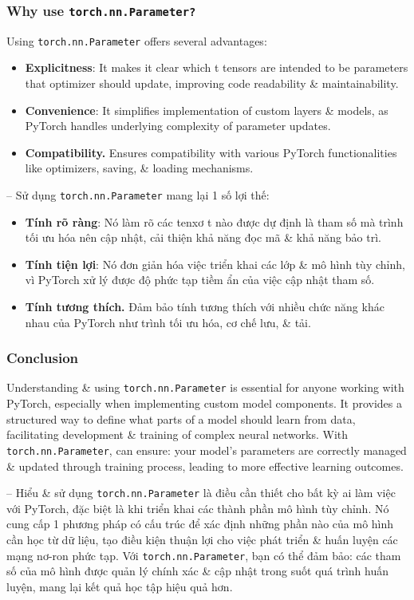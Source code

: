 \documentclass{article}
\begin{document}
\subsubsection{Why use {\tt torch.nn.Parameter?}}
Using {\tt torch.nn.Parameter} offers several advantages:
\begin{itemize}
    \item {\bf Explicitness}: It makes it clear which t tensors are intended to be parameters that optimizer should update, improving code readability \& maintainability.
    \item {\bf Convenience}: It simplifies implementation of custom layers \& models, as PyTorch handles underlying complexity of parameter updates.
    \item {\bf Compatibility.} Ensures compatibility with various PyTorch functionalities like optimizers, saving, \& loading mechanisms.
\end{itemize}
-- Sử dụng {\tt torch.nn.Parameter} mang lại 1 số lợi thế:
\begin{itemize}
    \item {\bf Tính rõ ràng}: Nó làm rõ các tenxơ t nào được dự định là tham số mà trình tối ưu hóa nên cập nhật, cải thiện khả năng đọc mã \& khả năng bảo trì.
    \item {\bf Tính tiện lợi}: Nó đơn giản hóa việc triển khai các lớp \& mô hình tùy chỉnh, vì PyTorch xử lý được độ phức tạp tiềm ẩn của việc cập nhật tham số.
    \item {\bf Tính tương thích.} Đảm bảo tính tương thích với nhiều chức năng khác nhau của PyTorch như trình tối ưu hóa, cơ chế lưu, \& tải.
\end{itemize}


\subsubsection{Conclusion}
Understanding \& using {\tt torch.nn.Parameter} is essential for anyone working with PyTorch, especially when implementing custom model components. It provides a structured way to define what parts of a model should learn from data, facilitating development \& training of complex neural networks. With {\tt torch.nn.Parameter}, can ensure: your model's parameters are correctly managed \& updated through training process, leading to more effective learning outcomes.

-- Hiểu \& sử dụng {\tt torch.nn.Parameter} là điều cần thiết cho bất kỳ ai làm việc với PyTorch, đặc biệt là khi triển khai các thành phần mô hình tùy chỉnh. Nó cung cấp 1 phương pháp có cấu trúc để xác định những phần nào của mô hình cần học từ dữ liệu, tạo điều kiện thuận lợi cho việc phát triển \& huấn luyện các mạng nơ-ron phức tạp. Với {\tt torch.nn.Parameter}, bạn có thể đảm bảo: các tham số của mô hình được quản lý chính xác \& cập nhật trong suốt quá trình huấn luyện, mang lại kết quả học tập hiệu quả hơn.
\end{document}
